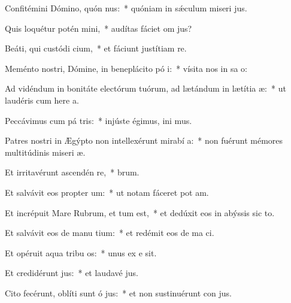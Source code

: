 \item Confitémini Dómino, quón nus:~* quóniam in sǽculum miseri jus.
\item Quis loquétur potén mini,~* audítas fáciet om  jus?
\item Beáti, qui custódi cium,~* et fáciunt justítiam   re.
\item Meménto nostri, Dómine, in beneplácito pó i:~* vísita nos in sa o:
\item Ad vidéndum in bonitáte electórum tuórum, ad lætándum in lætítia  æ:~* ut laudéris cum here a.
\item Peccávimus cum pá tris:~* injúste égimus, ini mus.
\item Patres nostri in Ægýpto non intellexérunt mirabí a:~* non fuérunt mémores multitúdinis miseri æ.
\item Et irritavérunt ascendén  re,~*  brum.
\item Et salvávit eos propter  um:~* ut notam fáceret pot am.
\item Et incrépuit Mare Rubrum, et tum est,~* et dedúxit eos in abýssis sic  to.
\item Et salvávit eos de manu tium:~* et redémit eos de ma ci.
\item Et opéruit aqua tribu os:~* unus ex e  sit.
\item Et credidérunt  jus:~* et laudavé  jus.
\item Cito fecérunt, oblíti sunt ó jus:~* et non sustinuérunt con jus.
